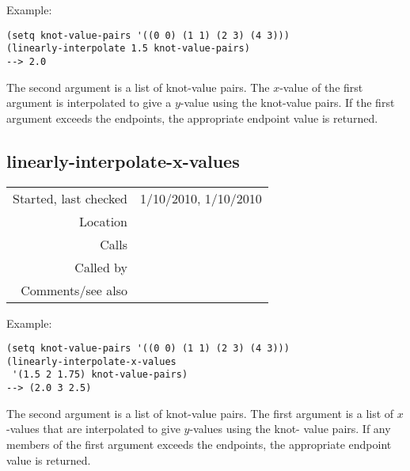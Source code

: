 \vspace{0.5cm}
\noindent Example:
\begin{verbatim}
(setq knot-value-pairs '((0 0) (1 1) (2 3) (4 3)))
(linearly-interpolate 1.5 knot-value-pairs)
--> 2.0
\end{verbatim}

\noindent The second argument is a list of knot-value
pairs. The $x$-value of the first argument is
interpolated to give a $y$-value using the knot-value
pairs. If the first argument exceeds the endpoints,
the appropriate endpoint value is returned.


\subsection*{linearly-interpolate-x-values}\label{fun:linearly-interpolate-x-values}

\vspace{0.3cm}
\begin{tabular}{r|p{8cm}}
Started, last checked & 1/10/2010, 1/10/2010 \\
Location & \nameref{sec:interpolation} \\
Calls & \nameref{fun:linearly-interpolate} \\
Called by & \\
Comments/see also & 
\end{tabular}

\vspace{0.5cm}
\noindent Example:
\begin{verbatim}
(setq knot-value-pairs '((0 0) (1 1) (2 3) (4 3)))
(linearly-interpolate-x-values
 '(1.5 2 1.75) knot-value-pairs)
--> (2.0 3 2.5)
\end{verbatim}

\noindent The second argument is a list of knot-value
pairs. The first argument is a list of $x$-values that
are interpolated to give $y$-values using the knot-
value pairs. If any members of the first argument
exceeds the endpoints, the appropriate endpoint value
is returned.











